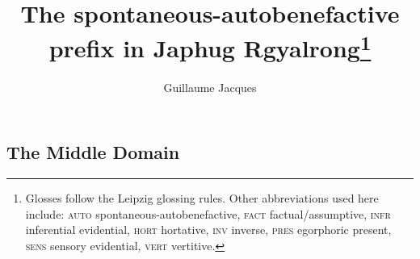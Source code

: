 \documentclass[oldfontcommands,oneside,a4paper,11pt]{article}
\begin{document}
 
 \title{ The spontaneous-autobenefactive prefix in Japhug Rgyalrong\footnote{Glosses follow the Leipzig glossing rules. Other abbreviations used here include: \textsc{auto} spontaneous-autobenefactive, \textsc{fact} factual/assumptive, \textsc{infr} inferential evidential, \textsc{hort} hortative, \textsc{inv} inverse, \textsc{pres} egorphoric present, \textsc{sens} sensory  evidential, \textsc{vert} vertitive. }}
  
\author{Guillaume Jacques}
\maketitle
\linenumbers
\sloppy

\subsection{The Middle Domain}
%
%
\end{document}
